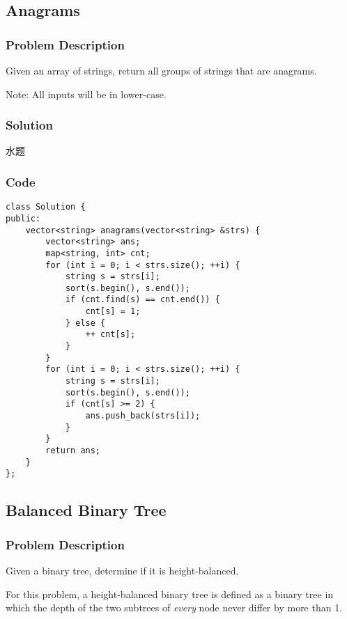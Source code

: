 \documentclass[courier]{article}
\begin{document}
\begin{CJK*}{UTF8}{gkai}
\subsection{ Anagrams }

\subsubsection*{Problem Description}
Given an array of strings, return all groups of strings that are anagrams.

Note: All inputs will be in lower-case.



\subsubsection*{Solution}
水题

\subsubsection*{Code}
\begin{lstlisting}
class Solution {
public:
    vector<string> anagrams(vector<string> &strs) {
        vector<string> ans;
        map<string, int> cnt;
        for (int i = 0; i < strs.size(); ++i) {
            string s = strs[i];
            sort(s.begin(), s.end());
            if (cnt.find(s) == cnt.end()) {
                cnt[s] = 1;
            } else {
                ++ cnt[s];
            }
        }
        for (int i = 0; i < strs.size(); ++i) {
            string s = strs[i];
            sort(s.begin(), s.end());
            if (cnt[s] >= 2) {
                ans.push_back(strs[i]);
            }
        }
        return ans;
    }
};

\end{lstlisting}


\subsection{ Balanced Binary Tree }

\subsubsection*{Problem Description}
Given a binary tree, determine if it is height-balanced.

For this problem, a height-balanced binary tree is defined as a binary tree in which the depth of the two subtrees of \emph{every} node never differ by more than 1.




\end{CJK*}
\end{document}
